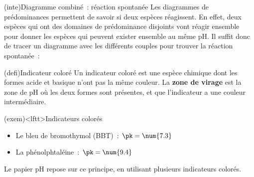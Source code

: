 \documentclass[../../main/main.tex]{subfiles}
\begin{document}
\begin{tcb*}(inte){Diagramme combiné~: réaction spontanée}
	Les diagrammes de prédominances permettent de savoir si deux espèces
	réagissent. En effet, deux espèces qui ont des domaines de prédominance
	disjoints vont réagir ensemble pour donner les espèces qui peuvent exister
	ensemble au même pH. Il suffit donc de tracer un diagramme avec les
	différents couples pour trouver la réaction spontanée~:
	\begin{center}
	\end{center}
\end{tcb*}

\begin{tcb*}(defi){Indicateur coloré}
	Un indicateur coloré est une espèce chimique dont les formes acide et basique
	n'ont pas la même couleur. La \textbf{zone de virage} est la zone de pH où les
	deux formes sont présentes, et que l'indicateur a une couleur intermédiaire.
\end{tcb*}
\begin{tcb*}(exem)<lftt>{Indicateurs colorés}
	\begin{itemize}
		\item Le bleu de bromothymol (BBT)~: $\pk = \num{7.3}$
		\item La phénolphtaléine~: $\pk = \num{9.4}$
	\end{itemize}
	Le papier pH repose sur ce principe, en utilisant plusieurs indicateurs
	colorés.
\end{tcb*}
\end{document}
